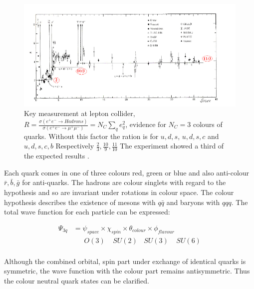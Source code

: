 \begin{figure}[h!]
\includegraphics[width=1.1\textwidth, left]{images/Intro/Ratio.png}
\caption{Key measurement at lepton collider, $R = \frac{\sigma(e^+e^- \rightarrow Hadrons)}{\sigma(e^+e^- \rightarrow \mu^+ \mu^-)} =N_C \sum_q e^2_q$, evidence for $N_C=3$ colours of quarks. Without this factor the ration is for $ u, d, s $, $ u, d, s, c $ and $ u, d, s, c, b $ Respectively $ \frac{2}{3}, \frac{10}{9}, \frac{11}{10} $ The experiment showed a third of the expected results \cite{Eva}.}
\label{ratio}
\end{figure}


Each quark comes in one of three colours red, green or blue and also anti-colour $ \bar{r}, \bar{b}, \bar{g} $  for anti-quarks. The hadrons are colour singlets with regard to the hypothesis and so are invariant under rotations in colour space. The colour hypothesis describes the existence of mesons with $ q \bar{q} $ and baryons with $ qqq $. The total wave function for each particle can be expressed:

\begin{equation}
\begin{split}
\Psi_{3q} &= \psi_{space} \times \chi_{spin} \times \theta_{colour} \times \phi_{flavour} \\
&\:\:\:\:\:\:\:O(3) \:\:\:\:\: SU(2)\:\:\:\: SU(3)\:\:\:\:\: SU(6)\\
\end{split}
\end{equation}

Although the combined orbital, spin part under exchange of identical quarks is symmetric, the wave function with the colour part remains antisymmetric. Thus the colour neutral quark states can be clarified.

